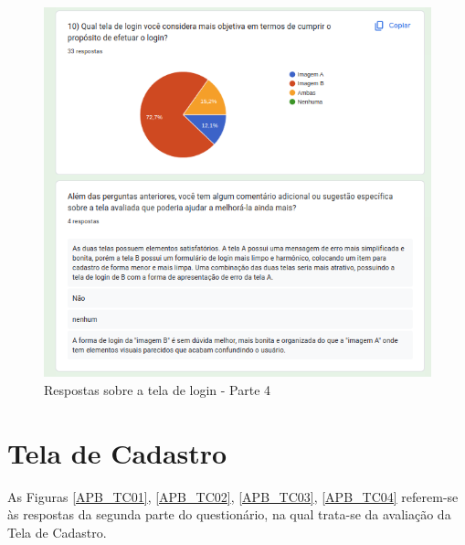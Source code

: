 \begin{figure}[!h]
	\begin{center}
	    \includegraphics[scale=0.7]{figs/Answers/Students/07.png}
	\end{center}
	\caption{\label{APB_TL04}Respostas sobre a tela de login - Parte 4}
\end{figure}

\newpage

\section{Tela de Cadastro}

As Figuras \ref{APB_TC01}, \ref{APB_TC02}, \ref{APB_TC03}, \ref{APB_TC04} referem-se às respostas da segunda parte do questionário, na qual trata-se da avaliação da Tela de Cadastro.

